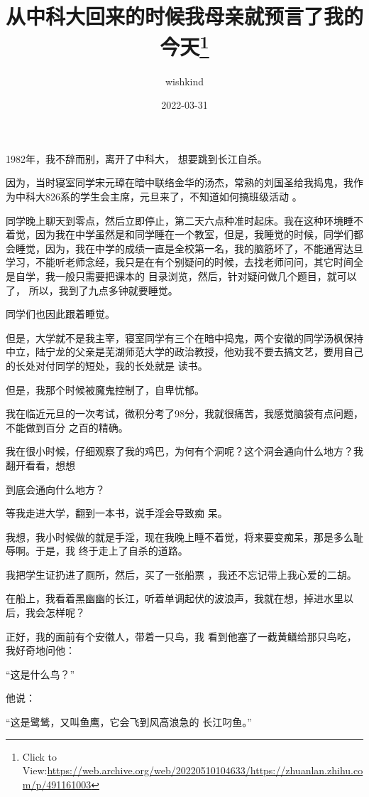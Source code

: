 \documentclass{article}
\title{从中科大回来的时候我母亲就预言了我的今天\footnote{Click to View:\url{https://web.archive.org/web/20220510104633/https://zhuanlan.zhihu.com/p/491161003}}}
\author{wishkind}
\date{2022-03-31}
\begin{document}

\maketitle


\Large

﻿1982年，我不辞而别，离开了中科大，
想要跳到长江自杀。 

因为，当时寝室同学宋元璋在暗中联络金华的汤杰，常熟的刘国圣给我捣鬼，我作为中科大826系的学生会主席，元旦来了，不知道如何搞班级活动
。 

同学晚上聊天到零点，然后立即停止，第二天六点种准时起床。我在这种环境睡不着觉，因为我在中学虽然是和同学睡在一个教室，但是，我睡觉的时候，同学们都会睡觉，因为，我在中学的成绩一直是全校第一名，我的脑筋坏了，不能通宵达旦学习，不能听老师念经，我只是在有个别疑问的时候，去找老师问问，其它时间全是自学，我一般只需要把课本的
\newpage
目录浏览，然后，针对疑问做几个题目，就可以了，
所以，我到了九点多钟就要睡觉。 


同学们也因此跟着睡觉。 

但是，大学就不是我主宰，寝室同学有三个在暗中捣鬼，两个安徽的同学汤枫保持中立，陆宁龙的父亲是芜湖师范大学的政治教授，他劝我不要去搞文艺，要用自己的长处对付同学的短处，我的长处就是
读书。 

但是，我那个时候被魔鬼控制了，自卑忧郁。
 

我在临近元旦的一次考试，微积分考了98分，我就很痛苦，我感觉脑袋有点问题，不能做到百分
之百的精确。 

我在很小时候，仔细观察了我的鸡巴，为何有个洞呢？这个洞会通向什么地方？我翻开看看，想想

\newpage
到底会通向什么地方？ 

等我走进大学，翻到一本书，说手淫会导致痴
呆。 

我想，我小时候做的就是手淫，现在我晚上睡不着觉，将来要变痴呆，那是多么耻辱啊。于是，我
终于走上了自杀的道路。 

我把学生证扔进了厕所，然后，买了一张船票
，我还不忘记带上我心爱的二胡。 

在船上，我看着黑幽幽的长江，听着单调起伏的波浪声，我就在想，掉进水里以后，我会怎样呢？

正好，我的面前有个安徽人，带着一只鸟，我
看到他塞了一截黄鳝给那只鸟吃，我好奇地问他： 


“这是什么鸟？” 


他说： 

\newpage

“这是鹭鸶，又叫鱼鹰，它会飞到风高浪急的
长江叼鱼。” 
\end{document}

